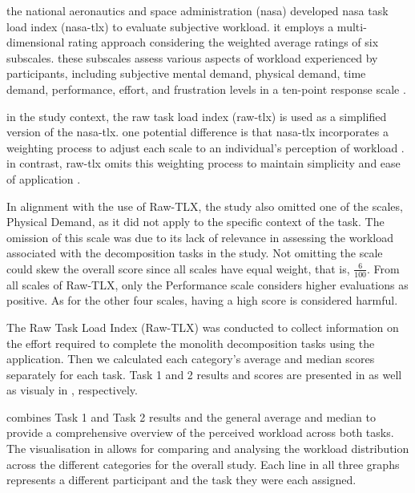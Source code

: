 the national aeronautics and space administration (nasa) developed nasa task
load index (nasa-tlx) to evaluate subjective workload. it employs a
multi-dimensional rating approach considering the weighted average ratings of
six subscales. these subscales assess various aspects of workload experienced
by participants, including subjective mental demand, physical demand, time
demand, performance, effort, and frustration levels in a ten-point response
scale \cite{hart1988development}.

in the study context, the raw task load index (raw-tlx) is used as a simplified
version of the nasa-tlx. one potential difference is that nasa-tlx incorporates
a weighting process to adjust each scale to an individual's perception of
workload \cite{hart1988development}. in contrast, raw-tlx omits this weighting
process to maintain simplicity and ease of application \cite{hart2006nasa}.

In alignment with the use of Raw-TLX, the study also omitted one of the scales,
Physical Demand, as it did not apply to the specific context of the task. The
omission of this scale was due to its lack of relevance in assessing the
workload associated with the decomposition tasks in the study. Not omitting the
scale could skew the overall score since all scales have equal weight, that is,
\( \frac{6}{100} \). From all scales of Raw-TLX, only the Performance scale
considers higher evaluations as positive. As for the other four scales, having
a high score is considered harmful.

The Raw Task Load Index (Raw-TLX) was conducted to collect information on the
effort required to complete the monolith decomposition tasks using the
application. Then we calculated each category's average and median scores
separately for each task. Task 1 and 2 results and scores are presented in
 as well as visualy in
, respectively.

 combines Task 1 and Task 2 results and the general
average and median to provide a comprehensive overview of the perceived
workload across both tasks. The visualisation in 
allows for comparing and analysing the workload distribution across the
different categories for the overall study. Each line in all three graphs
represents a different participant and the task they were each assigned.

